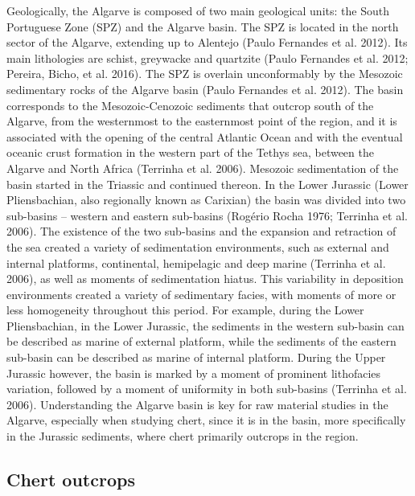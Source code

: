 \documentclass[
  a4paper,
  DIV=11,
  numbers=noendperiod]{scrreprt}
\begin{document}
Geologically, the Algarve is composed of two main geological units: the
South Portuguese Zone (SPZ) and the Algarve basin. The SPZ is located in
the north sector of the Algarve, extending up to Alentejo (Paulo
Fernandes et al. 2012). Its main lithologies are schist, greywacke and
quartzite (Paulo Fernandes et al. 2012; Pereira, Bicho, et al. 2016).
The SPZ is overlain unconformably by the Mesozoic sedimentary rocks of
the Algarve basin (Paulo Fernandes et al. 2012). The basin corresponds
to the Mesozoic-Cenozoic sediments that outcrop south of the Algarve,
from the westernmost to the easternmost point of the region, and it is
associated with the opening of the central Atlantic Ocean and with the
eventual oceanic crust formation in the western part of the Tethys sea,
between the Algarve and North Africa (Terrinha et al. 2006). Mesozoic
sedimentation of the basin started in the Triassic and continued
thereon. In the Lower Jurassic (Lower Pliensbachian, also regionally
known as Carixian) the basin was divided into two sub-basins -- western
and eastern sub-basins (Rogério Rocha 1976; Terrinha et al. 2006). The
existence of the two sub-basins and the expansion and retraction of the
sea created a variety of sedimentation environments, such as external
and internal platforms, continental, hemipelagic and deep marine
(Terrinha et al. 2006), as well as moments of sedimentation hiatus. This
variability in deposition environments created a variety of sedimentary
facies, with moments of more or less homogeneity throughout this period.
For example, during the Lower Pliensbachian, in the Lower Jurassic, the
sediments in the western sub-basin can be described as marine of
external platform, while the sediments of the eastern sub-basin can be
described as marine of internal platform. During the Upper Jurassic
however, the basin is marked by a moment of prominent lithofacies
variation, followed by a moment of uniformity in both sub-basins
(Terrinha et al. 2006). Understanding the Algarve basin is key for raw
material studies in the Algarve, especially when studying chert, since
it is in the basin, more specifically in the Jurassic sediments, where
chert primarily outcrops in the region.

\subsection{Chert outcrops}\label{chert-outcrops}
\end{document}
